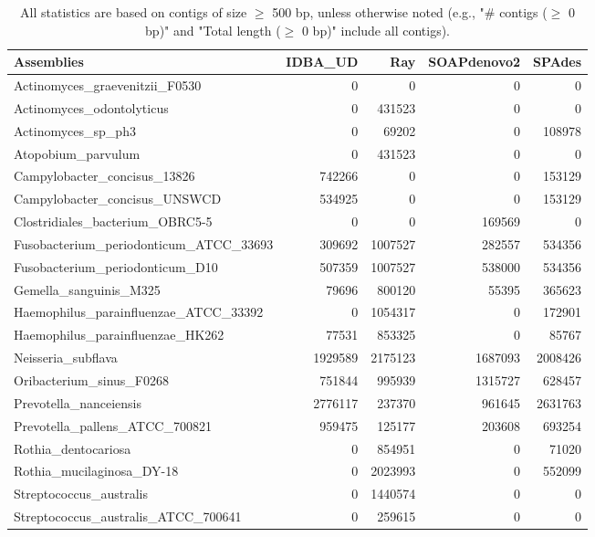 \documentclass[12pt,a4paper]{article}
\begin{document}
\begin{table}[ht]
\begin{center}
\caption{All statistics are based on contigs of size $\geq$ 500 bp, unless otherwise noted (e.g., "\# contigs ($\geq$ 0 bp)" and "Total length ($\geq$ 0 bp)" include all contigs).}
\begin{tabular}{|l*{4}{|r}|}
\hline
Assemblies & IDBA\_UD & Ray & SOAPdenovo2 & SPAdes \\ \hline
Actinomyces\_graevenitzii\_F0530 & 0 & 0 & 0 & 0 \\ \hline
Actinomyces\_odontolyticus & 0 & 431523 & 0 & 0 \\ \hline
Actinomyces\_sp\_ph3 & 0 & 69202 & 0 & 108978 \\ \hline
Atopobium\_parvulum & 0 & 431523 & 0 & 0 \\ \hline
Campylobacter\_concisus\_13826 & 742266 & 0 & 0 & 153129 \\ \hline
Campylobacter\_concisus\_UNSWCD & 534925 & 0 & 0 & 153129 \\ \hline
Clostridiales\_bacterium\_OBRC5-5 & 0 & 0 & 169569 & 0 \\ \hline
Fusobacterium\_periodonticum\_ATCC\_33693 & 309692 & 1007527 & 282557 & 534356 \\ \hline
Fusobacterium\_periodonticum\_D10 & 507359 & 1007527 & 538000 & 534356 \\ \hline
Gemella\_sanguinis\_M325 & 79696 & 800120 & 55395 & 365623 \\ \hline
Haemophilus\_parainfluenzae\_ATCC\_33392 & 0 & 1054317 & 0 & 172901 \\ \hline
Haemophilus\_parainfluenzae\_HK262 & 77531 & 853325 & 0 & 85767 \\ \hline
Neisseria\_subflava & 1929589 & 2175123 & 1687093 & 2008426 \\ \hline
Oribacterium\_sinus\_F0268 & 751844 & 995939 & 1315727 & 628457 \\ \hline
Prevotella\_nanceiensis & 2776117 & 237370 & 961645 & 2631763 \\ \hline
Prevotella\_pallens\_ATCC\_700821 & 959475 & 125177 & 203608 & 693254 \\ \hline
Rothia\_dentocariosa & 0 & 854951 & 0 & 71020 \\ \hline
Rothia\_mucilaginosa\_DY-18 & 0 & 2023993 & 0 & 552099 \\ \hline
Streptococcus\_australis & 0 & 1440574 & 0 & 0 \\ \hline
Streptococcus\_australis\_ATCC\_700641 & 0 & 259615 & 0 & 0 \\ \hline

\end{tabular}
\end{center}
\end{table}
\end{document}
